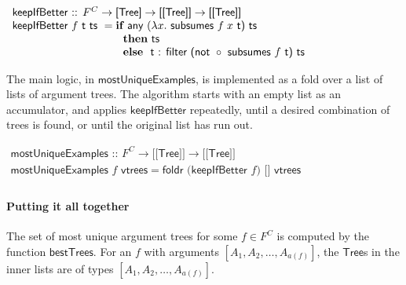 \begin{EmptyItem}
$\begin{array}{p{3.2cm} l}
\multicolumn{2}{l}{\textsf{keepIfBetter :: } F^C  \rightarrow \textsf{[Tree]} \rightarrow \textsf{[[Tree]]} \rightarrow \textsf{[[Tree]]}} \\
\multicolumn{2}{l}{\textsf{keepIfBetter } f \textsf{ t ts } = \textbf{if } \textsf{any } (\lambda x. \textsf{ subsumes } f \; x \textsf{ t) ts}} \\
  & \textbf{then} \textsf{ ts} \\
  & \textbf{else} \textsf{~~t : filter (not }
    \circ \textsf{ subsumes } f \textsf{ t) ts} \\
\end{array}$
\end{EmptyItem}

The main logic, in $\textsf{mostUniqueExamples}$, is implemented as a
fold over a list of lists of argument trees.
The algorithm starts with an empty list as an accumulator, and applies
$\textsf{keepIfBetter}$ repeatedly, until a desired combination of
trees is found, or until the original list has run out.


\begin{EmptyItem}
$\begin{array}{l}
\textsf{mostUniqueExamples :: } F^C \rightarrow \textsf{[[Tree]]} \rightarrow \textsf{[[Tree]]} \\
\textsf{mostUniqueExamples } f \textsf{ vtrees} = \textsf{foldr (keepIfBetter } f \textsf{) [] vtrees} \\
\end{array}$
\end{EmptyItem}

\paragraph{Putting it all together}
The set of most unique argument trees for some $f \in F^C$
is computed by the function $\textsf{bestTrees}$.
For an $f$ with arguments $[A_1,A_2,\dots,A_{a(f)}]$, the $\textsf{Tree}$s in
the inner lists are of types $[A_1,A_2,\dots,A_{a(f)}]$. 

